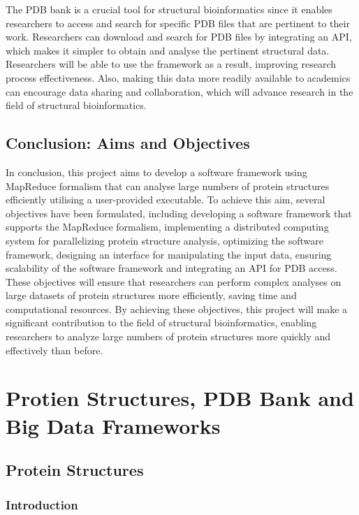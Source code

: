 \documentclass[]{final_report}
\begin{document}
The PDB bank is a crucial tool for structural bioinformatics since it enables researchers to access and search for specific PDB files that are pertinent to their work. Researchers can download and search for PDB files by integrating an API, which makes it simpler to obtain and analyse the pertinent structural data. Researchers will be able to use the framework as a result, improving research process effectiveness. Also, making this data more readily available to academics can encourage data sharing and collaboration, which will advance research in the field of structural bioinformatics.

\clearpage

\subsection{Conclusion: Aims and Objectives}

In conclusion, this project aims to develop a software framework using MapReduce formalism that can analyse large numbers of protein structures efficiently utilising a user-provided executable. To achieve this aim, several objectives have been formulated, including developing a software framework that supports the MapReduce formalism, implementing a distributed computing system for parallelizing protein structure analysis, optimizing the software framework, designing an interface for manipulating the input data, ensuring scalability of the software framework and integrating an API for PDB access. These objectives will ensure that researchers can perform complex analyses on large datasets of protein structures more efficiently, saving time and computational resources. By achieving these objectives, this project will make a significant contribution to the field of structural bioinformatics, enabling researchers to analyze large numbers of protein structures more quickly and effectively than before.

\section{Protien Structures, PDB Bank and Big Data Frameworks}
\subsection{Protein Structures}
\subsubsection{Introduction}
\end{document}
